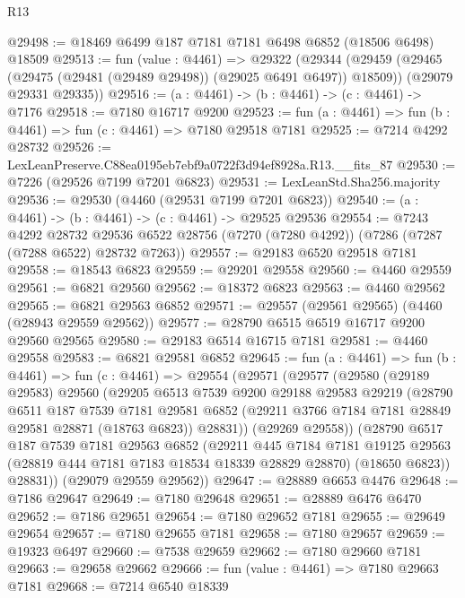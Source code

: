 \begin{lexlean}{R13}
\begin{coremodule}
@29498 := @18469 @6499 @187 @7181 @7181 @6498 @6852 (@18506 @6498) @18509
@29513 := fun (value : @4461) =>
  @29322
    (@29344
      (@29459 (@29465 (@29475 (@29481 (@29489 @29498)) (@29025 @6491 @6497)) @18509))
      (@29079 @29331 @29335))
@29516 := (a : @4461) -> (b : @4461) -> (c : @4461) -> @7176
@29518 := @7180 @16717 @9200
@29523 := fun (a : @4461) => fun (b : @4461) => fun (c : @4461) => @7180 @29518 @7181
@29525 := @7214 @4292 @28732
@29526 := LexLeanPreserve.C88ea0195eb7ebf9a0722f3d94ef8928a.R13.__fits_87
@29530 := @7226 (@29526 @7199 @7201 @6823)
@29531 := LexLeanStd.Sha256.majority
@29536 := @29530 (@4460 (@29531 @7199 @7201 @6823))
@29540 := (a : @4461) -> (b : @4461) -> (c : @4461) -> @29525 @29536
@29554 := @7243
    @4292
    @28732
    @29536
    @6522
    @28756
    (@7270 (@7280 @4292))
    (@7286 (@7287 (@7288 @6522) @28732 @7263))
@29557 := @29183 @6520 @29518 @7181
@29558 := @18543 @6823
@29559 := @29201 @29558
@29560 := @4460 @29559
@29561 := @6821 @29560
@29562 := @18372 @6823
@29563 := @4460 @29562
@29565 := @6821 @29563 @6852
@29571 := @29557 (@29561 @29565) (@4460 (@28943 @29559 @29562))
@29577 := @28790 @6515 @6519 @16717 @9200 @29560 @29565
@29580 := @29183 @6514 @16715 @7181
@29581 := @4460 @29558
@29583 := @6821 @29581 @6852
@29645 := fun (a : @4461) =>
  fun (b : @4461) =>
  fun (c : @4461) =>
  @29554
    (@29571
      (@29577
        (@29580
          (@29189 @29583)
          @29560
          (@29205
            @6513
            @7539
            @9200
            @29188
            @29583
            @29219
            (@28790
              @6511
              @187
              @7539
              @7181
              @29581
              @6852
              (@29211 @3766 @7184 @7181 @28849 @29581 @28871 (@18763 @6823))
              @28831))
          (@29269 @29558))
        (@28790
          @6517
          @187
          @7539
          @7181
          @29563
          @6852
          (@29211
            @445
            @7184
            @7181
            @19125
            @29563
            (@28819 @444 @7181 @7183 @18534 @18339 @28829 @28870)
            (@18650 @6823))
          @28831))
      (@29079 @29559 @29562))
@29647 := @28889 @6653 @4476
@29648 := @7186 @29647
@29649 := @7180 @29648
@29651 := @28889 @6476 @6470
@29652 := @7186 @29651
@29654 := @7180 @29652 @7181
@29655 := @29649 @29654
@29657 := @7180 @29655 @7181
@29658 := @7180 @29657
@29659 := @19323 @6497
@29660 := @7538 @29659
@29662 := @7180 @29660 @7181
@29663 := @29658 @29662
@29666 := fun (value : @4461) => @7180 @29663 @7181
@29668 := @7214 @6540 @18339

\end{coremodule}
\end{lexlean}
